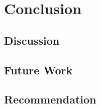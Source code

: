%
%
\chapter{Conclusion}

\section{Discussion}

\section{Future Work}

\section{Recommendation}

\clearpage